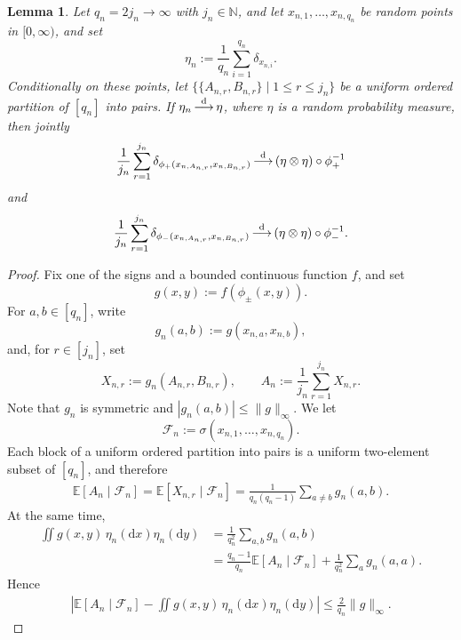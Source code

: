 \documentclass[english,11pt]{smfart}
\newcommand{\ndN}{\mathbb{N}}
\newcommand{\Exb}[1]{\mathbb{E}\left[#1\right]}
\newcommand{\convdis}{\,{\buildrel \mathrm{d} \over \longrightarrow}\,}
\newcommand{\cF}{\mathcal{F}}
\newtheorem{lemma}[theorem]{Lemma}
\numberwithin{equation}{section}
\begin{document}
\begin{lemma}
	\label{le:matching}
	Let $q_n = 2j_n \to \infty$ with $j_n \in \ndN$, and let $x_{n,1}, \ldots, x_{n,q_n}$ be random points in $[0,\infty)$, and set
	\[
		\eta_n := \frac{1}{q_n}\sum_{i=1}^{q_n}\delta_{x_{n,i}}.
	\]
	Conditionally on these points, let $\{\{A_{n,r},B_{n,r}\} \mid 1\le r\le j_n\}$ be a uniform ordered partition of $[q_n]$ into pairs. If $\eta_n\convdis\eta$, where $\eta$ is a random probability measure, then jointly
	\[
		\frac{1}{j_n}\sum_{r=1}^{j_n} \delta_{\phi_+(x_{n,A_{n,r}},x_{n,B_{n,r}})} \convdis(\eta\otimes\eta)\circ\phi_+^{-1}
	\]
	and
	\[
		\frac{1}{j_n}\sum_{r=1}^{j_n} \delta_{\phi_-(x_{n,A_{n,r}},x_{n,B_{n,r}})} \convdis(\eta\otimes\eta)\circ\phi_-^{-1}.
	\]
\end{lemma}
\begin{proof}
	Fix one of the signs and a bounded continuous function $f$, and set
		\[
		g(x,y):=f(\phi_\pm(x,y)).
		\]
	For $a,b\in[q_n]$, write
		\[
		g_n(a,b):=g(x_{n,a},x_{n,b}),
		\]
	and, for $r\in[j_n]$, set
		\[
		X_{n,r}:=g_n(A_{n,r},B_{n,r}),
		\qquad
		A_n:=\frac{1}{j_n}\sum_{r=1}^{j_n}X_{n,r}.
		\]
	Note that $g_n$ is symmetric and $|g_n(a,b)|\le\|g\|_\infty$. We let
		\[
		\cF_n:=\sigma(x_{n,1},\ldots,x_{n,q_n}).
		\]
	Each block of a uniform ordered partition into pairs is a uniform two-element subset of $[q_n]$, and therefore
	\begin{align*}
		\Exb{A_n\mid\cF_n} = \Exb{X_{n,r}\mid\cF_n} = \frac{1}{q_n(q_n-1)} \sum_{a\ne b}g_n(a,b).
	\end{align*}
	At the same time,
	\begin{align*}
		\iint g(x,y)\,\eta_n(\mathrm{d}x)\eta_n(\mathrm{d}y)
		&= \frac{1}{q_n^2}\sum_{a,b}g_n(a,b)\\
		&= \frac{q_n-1}{q_n}\Exb{A_n\mid\cF_n} +\frac{1}{q_n^2}\sum_a g_n(a,a).
	\end{align*}
	Hence
	\begin{align}
		\label{eq:yo0}
		\left| \Exb{A_n\mid\cF_n} -\iint g(x,y)\,\eta_n(\mathrm{d}x)\eta_n(\mathrm{d}y) \right| \le\frac{2}{q_n}\|g\|_\infty.
	\end{align}
		

\end{proof}
\end{document}
